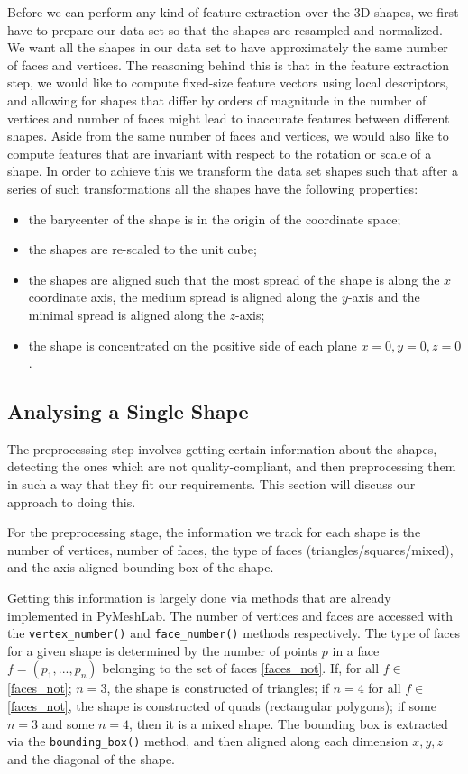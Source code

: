 Before we can perform any kind of feature extraction over the 3D shapes, we first have to prepare our data set so that the shapes are resampled and normalized.
We want all the shapes in our data set to have approximately the same number of faces and vertices.
The reasoning behind this is that in the feature extraction step, we would like to compute fixed-size feature vectors
using local descriptors, and allowing for shapes that differ by orders of magnitude in the number of vertices and
number of faces might lead to inaccurate features between different shapes.
Aside from the same number of faces and vertices, we would also like to compute features that are invariant with
respect to the rotation or scale of a shape.
In order to achieve this we transform the data set shapes such that after a series of such transformations all the
shapes have the following properties:
\begin{itemize}
    \item the barycenter of the shape is in the origin of the coordinate space;
    \item the shapes are re-scaled to the unit cube;
    \item the shapes are aligned such that the most spread of the shape is along the $x$ coordinate axis, the medium spread is aligned along the $y$-axis and the minimal spread is aligned along the $z$-axis;
    \item the shape is concentrated on the positive side of each plane $x = 0, y = 0, z = 0 $. 
\end{itemize}


\subsection{Analysing a Single Shape}
The preprocessing step involves getting certain information about the shapes, detecting the ones which are not
quality-compliant, and then preprocessing them in such a way that they fit our requirements.
This section will discuss our approach to doing this.

For the preprocessing stage, the information we track for each shape is the number of vertices, number of faces, the
type of faces (triangles/squares/mixed), and the axis-aligned bounding box of the shape.

Getting this information is largely done via methods that are already implemented in PyMeshLab.
The number of vertices and faces are accessed with the \verb!vertex_number()! and \verb!face_number()! methods
respectively.
The type of faces for a given shape is determined by the number of points $p$ in a face $f = (p_1, ..., p_n)$ belonging to the set of faces \ref{faces_not}.
If, for all $f \in$ \ref{faces_not}; $n = 3$, the shape is constructed of triangles;
if $n = 4$ for all $f \in$ \ref{faces_not}, the shape is constructed of quads (rectangular polygons);
if some $n = 3$ and some $n = 4$, then it is a mixed shape.
The bounding box is extracted via the \verb!bounding_box()! method, and then aligned along each dimension $x, y, z$ and the diagonal of the shape.

